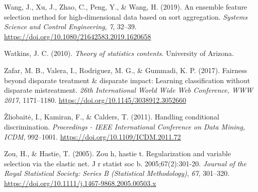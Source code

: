 \documentclass[
  11pt,
]{article}
\newlength{\cslhangindent}
\newlength{\cslentryspacingunit} %
\newenvironment{CSLReferences}[2] %
 {%
  \setlength{\parindent}{0pt}
  \ifodd #1
  \let\oldpar\par
  \def\par{\hangindent=\cslhangindent\oldpar}
  \fi
  \setlength{\parskip}{#2\cslentryspacingunit}
 }%
 {}
\begin{document}
\begin{CSLReferences}{1}{0}
\leavevmode{}%
Wang, J., Xu, J., Zhao, C., Peng, Y., \& Wang, H. (2019). An ensemble
feature selection method for high-dimensional data based on sort
aggregation. \emph{Systems Science and Control Engineering}, \emph{7},
32--39. \url{https://doi.org/10.1080/21642583.2019.1620658}

\leavevmode{}%
Watkins, J. C. (2010). \emph{Theory of statistics contents}. University
of Arizona.

\leavevmode{}%
Zafar, M. B., Valera, I., Rodriguez, M. G., \& Gummadi, K. P. (2017).
Fairness beyond disparate treatment \& disparate impact: Learning
classification without disparate mistreatment. \emph{26th International
World Wide Web Conference, WWW 2017}, 1171--1180.
\url{https://doi.org/10.1145/3038912.3052660}

\leavevmode{}%
Žliobaitė, I., Kamiran, F., \& Calders, T. (2011). Handling conditional
discrimination. \emph{Proceedings - IEEE International Conference on
Data Mining, ICDM}, 992--1001.
\url{https://doi.org/10.1109/ICDM.2011.72}

\leavevmode{}%
Zou, H., \& Hastie, T. (2005). Zou h, hastie t. Regularization and
variable selection via the elastic net. J r statist soc b.
2005;67(2):301-20. \emph{Journal of the Royal Statistical Society:
Series B (Statistical Methodology)}, \emph{67}, 301--320.
\url{https://doi.org/10.1111/j.1467-9868.2005.00503.x}

\end{CSLReferences}
\end{document}
